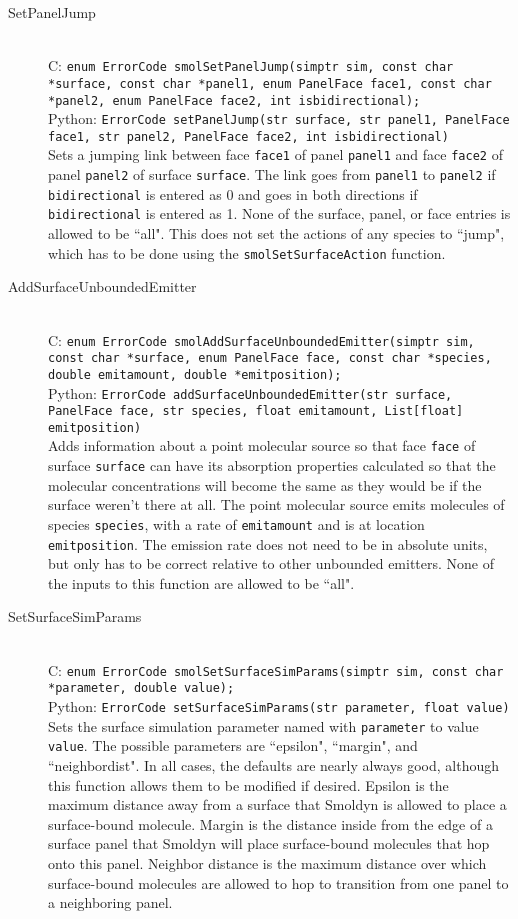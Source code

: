 \documentclass {book}
\begin{document}
\begin{description}
\item[SetPanelJump]
\hfill \\
C: \texttt{enum ErrorCode smolSetPanelJump(simptr sim, const char *surface, const char *panel1, enum PanelFace face1, const char *panel2, enum PanelFace face2, int isbidirectional);}\\
Python: \texttt{ErrorCode setPanelJump(str surface, str panel1, PanelFace face1, str panel2, PanelFace face2, int isbidirectional)}\\
Sets a jumping link between face \texttt{face1} of panel \texttt{panel1} and face \texttt{face2} of panel \texttt{panel2} of surface \texttt{surface}. The link goes from \texttt{panel1} to \texttt{panel2} if \texttt{bidirectional} is entered as 0 and goes in both directions if \texttt{bidirectional} is entered as 1. None of the surface, panel, or face entries is allowed to be ``all". This does not set the actions of any species to ``jump", which has to be done using the \texttt{smolSetSurfaceAction} function.

\item[AddSurfaceUnboundedEmitter]
\hfill \\
C: \texttt{enum ErrorCode smolAddSurfaceUnboundedEmitter(simptr sim, const char *surface, enum PanelFace face, const char *species, double emitamount, double *emitposition);}\\
Python: \texttt{ErrorCode addSurfaceUnboundedEmitter(str surface, PanelFace face, str species, float emitamount, List[float] emitposition)}\\
Adds information about a point molecular source so that face \texttt{face} of surface \texttt{surface} can have its absorption properties calculated so that the molecular concentrations will become the same as they would be if the surface weren't there at all. The point molecular source emits molecules of species \texttt{species}, with a rate of \texttt{emitamount} and is at location \texttt{emitposition}. The emission rate does not need to be in absolute units, but only has to be correct relative to other unbounded emitters. None of the inputs to this function are allowed to be ``all".

\item[SetSurfaceSimParams]
\hfill \\
C: \texttt{enum ErrorCode smolSetSurfaceSimParams(simptr sim, const char *parameter, double value);}\\
Python: \texttt{ErrorCode setSurfaceSimParams(str parameter, float value)}\\
Sets the surface simulation parameter named with \texttt{parameter} to value \texttt{value}. The possible parameters are ``epsilon", ``margin", and ``neighbordist". In all cases, the defaults are nearly always good, although this function allows them to be modified if desired. Epsilon is the maximum distance away from a surface that Smoldyn is allowed to place a surface-bound molecule. Margin is the distance inside from the edge of a surface panel that Smoldyn will place surface-bound molecules that hop onto this panel. Neighbor distance is the maximum distance over which surface-bound molecules are allowed to hop to transition from one panel to a neighboring panel.


\end{description}
\end{document}
